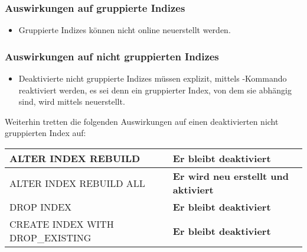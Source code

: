         \subsubsection{Auswirkungen auf gruppierte Indizes}
          \begin{itemize}
            \item Gruppierte Indizes können nicht online neuerstellt werden.
          \end{itemize}
        \subsubsection{Auswirkungen auf nicht gruppierten Indizes}
          \begin{itemize}
            \item Deaktivierte nicht gruppierte Indizes müssen explizit, mittels
            -Kommando reaktiviert werden, es sei denn
            ein gruppierter Index, von dem sie abhängig sind, wird mittels
             neuerstellt.
          \end{itemize}
          Weiterhin tretten die folgenden Auswirkungen auf einen deaktivierten
          nicht gruppierten Index auf:
          \begin{center}
            \begin{small}
            \tablehead{
            }
            \tabletail {
              \hline
            }
            \tablelasttail {
              \hline
            }
              \begin{supertabular}{|l|l|}
              ALTER INDEX REBUILD & \textbf{Er bleibt
              deaktiviert} \\
              \hline
              ALTER INDEX REBUILD ALL & \textbf{Er wird neu erstellt und
              aktiviert} \\
              \hline
              DROP INDEX & \textbf{Er bleibt
              deaktiviert} \\
              \hline
              CREATE INDEX WITH DROP\_EXISTING & \textbf{Er bleibt
              deaktiviert} \\
              \end{supertabular}
            \end{small}
          \end{center}
